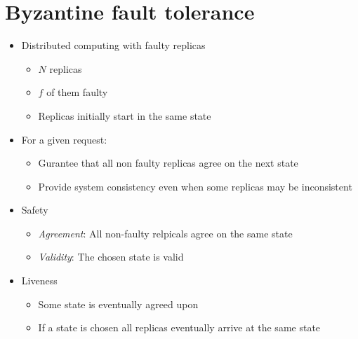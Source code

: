 \documentclass{easyclass}
\begin{document}
\section{Byzantine fault tolerance}
\begin{itemize}
    \item Distributed computing with faulty replicas
     \begin{itemize}
        \item $N$ replicas
        \item $f$ of them faulty
        \item Replicas initially start in the same state
    \end{itemize}
    \item For a given request:
    \begin{itemize}
        \item Gurantee that all non faulty replicas agree on the next state
        \item Provide system consistency even when some replicas may be inconsistent
    \end{itemize}
\end{itemize}

\begin{prf}[Properties]{}
    \begin{itemize}
        \item Safety
        \begin{itemize}
            \item \emph{Agreement}: All non-faulty relpicals agree on the same state
            \item \emph{Validity}: The chosen state is valid
        \end{itemize}
        \item Liveness
         \begin{itemize}
            \item Some state is eventually agreed upon
            \item If a state is chosen all replicas eventually arrive at the same state
        \end{itemize}
    \end{itemize}
\end{prf}
\end{document}
